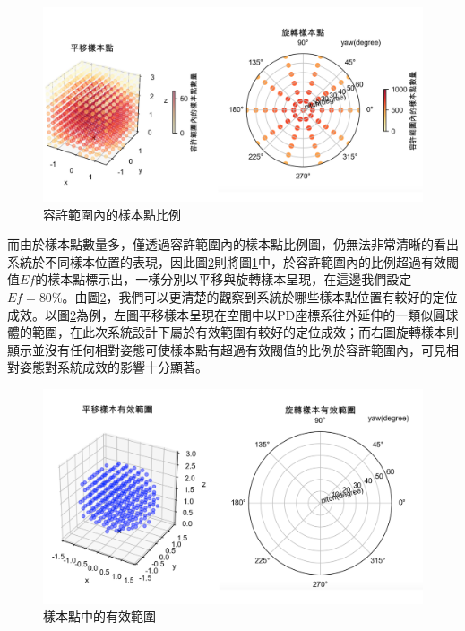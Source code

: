 \begin{figure}[htpb]
    \centering
    \includegraphics[width=14cm]{ch4pic/sample_out.png}
    \caption{容許範圍內的樣本點比例}
    \label{pic:sample_out}
\end{figure}

而由於樣本點數量多，僅透過容許範圍內的樣本點比例圖，仍無法非常清晰的看出系統於不同樣本位置的表現，因此圖\ref{pic:effective}則將圖\ref{pic:sample_out}中，於容許範圍內的比例超過有效閥值$Ef$的樣本點標示出，一樣分別以平移與旋轉樣本呈現，在這邊我們設定$Ef=80\%$。由圖\ref{pic:effective}，我們可以更清楚的觀察到系統於哪些樣本點位置有較好的定位成效。以圖\ref{pic:effective}為例，左圖平移樣本呈現在空間中以PD座標系往外延伸的一類似圓球體的範圍，在此次系統設計下屬於有效範圍有較好的定位成效；而右圖旋轉樣本則顯示並沒有任何相對姿態可使樣本點有超過有效閥值的比例於容許範圍內，可見相對姿態對系統成效的影響十分顯著。

\begin{figure}[htpb]
    \centering
    \includegraphics[width=14cm]{ch4pic/effective.png}
    \caption{樣本點中的有效範圍}
    \label{pic:effective}
\end{figure}





